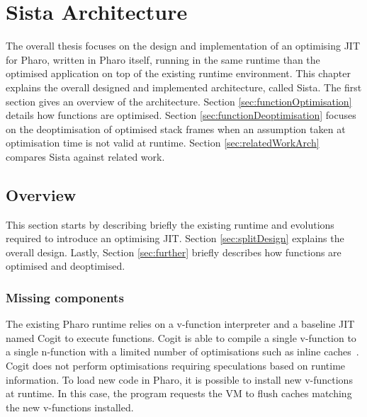\documentclass[a4paper,12pt,twoside]{../includes/ThesisStyle}
\begin{document}
\fi

\chapter{Sista Architecture}
\label{chap:architecture}
\minitoc

The overall thesis focuses on the design and implementation of an optimising JIT for Pharo, written in Pharo itself, running in the same runtime than the optimised application on top of the existing runtime environment. This chapter explains the overall designed and implemented architecture, called Sista. The first section gives an overview of the architecture. Section \ref{sec:functionOptimisation} details how functions are optimised. Section \ref{sec:functionDeoptimisation} focuses on the deoptimisation of optimised stack frames when an assumption taken at optimisation time is not valid at runtime. Section \ref{sec:relatedWorkArch} compares Sista against related work.


\section{Overview}

This section starts by describing briefly the existing runtime and evolutions required to introduce an optimising JIT. Section \ref{sec:splitDesign} explains the overall design. Lastly, Section \ref{sec:further} briefly describes how functions are optimised and deoptimised. 

\subsection{Missing components}

The existing Pharo runtime relies on a v-function interpreter and a baseline JIT named Cogit to execute functions. Cogit is able to compile a single v-function to a single n-function with a limited number of optimisations such as inline caches~\cite{Deut84a,Holz91a}. Cogit does not perform optimisations requiring speculations based on runtime information. To load new code in Pharo, it is possible to install new v-functions at runtime. In this case, the program requests the VM to flush caches matching the new v-functions installed.
\end{document}
